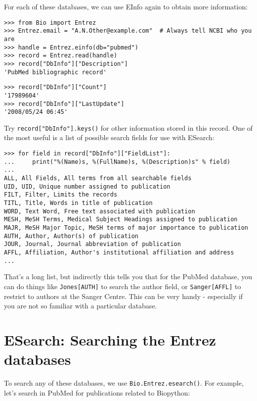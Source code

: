For each of these databases, we can use EInfo again to obtain more information:

\begin{verbatim}
>>> from Bio import Entrez
>>> Entrez.email = "A.N.Other@example.com"  # Always tell NCBI who you are
>>> handle = Entrez.einfo(db="pubmed")
>>> record = Entrez.read(handle)
>>> record["DbInfo"]["Description"]
'PubMed bibliographic record'
\end{verbatim}
\begin{verbatim}
>>> record["DbInfo"]["Count"]
'17989604'
>>> record["DbInfo"]["LastUpdate"]
'2008/05/24 06:45'
\end{verbatim}
Try \verb+record["DbInfo"].keys()+ for other information stored in this record.
One of the most useful is a list of possible search fields for use with ESearch:

\begin{verbatim}
>>> for field in record["DbInfo"]["FieldList"]:
...     print("%(Name)s, %(FullName)s, %(Description)s" % field)
...
ALL, All Fields, All terms from all searchable fields
UID, UID, Unique number assigned to publication
FILT, Filter, Limits the records
TITL, Title, Words in title of publication
WORD, Text Word, Free text associated with publication
MESH, MeSH Terms, Medical Subject Headings assigned to publication
MAJR, MeSH Major Topic, MeSH terms of major importance to publication
AUTH, Author, Author(s) of publication
JOUR, Journal, Journal abbreviation of publication
AFFL, Affiliation, Author's institutional affiliation and address
...
\end{verbatim}

That's a long list, but indirectly this tells you that for the PubMed
database, you can do things like \texttt{Jones[AUTH]} to search the
author field, or \texttt{Sanger[AFFL]} to restrict to authors at the
Sanger Centre. This can be very handy - especially if you are not so
familiar with a particular database.

\section{ESearch: Searching the Entrez databases}
\label{sec:entrez-esearch}
To search any of these databases, we use \verb+Bio.Entrez.esearch()+. For example, let's search in PubMed for publications related to Biopython:

